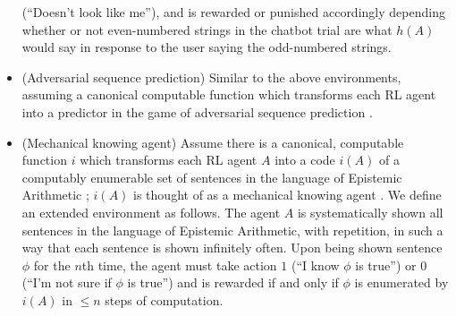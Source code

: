 \documentclass[runningheads]{llncs}
\begin{document}
\begin{example}
\begin{itemize}
        (``Doesn't look like me''), and is rewarded or punished accordingly depending
        whether or not even-numbered strings in the chatbot trial are what $h(A)$ would
        say in response to the user saying the odd-numbered strings.
        \item
        (Adversarial sequence prediction) Similar to the above environments, assuming
        a canonical computable function which transforms each RL agent into a predictor
        in the game of adversarial sequence prediction \cite{hibbard2008adversarial}
        \cite{hibbard}.
        \item
        (Mechanical knowing agent) Assume there is a canonical, computable function
        $i$ which transforms each RL agent $A$ into a code $i(A)$ of a computably
        enumerable set of sentences in the language of Epistemic Arithmetic
        \cite{shapiro}; $i(A)$ is thought of as a mechanical knowing agent
        \cite{carlson}. We define an extended environment as follows. The agent $A$
        is systematically shown all sentences in the language of Epistemic Arithmetic,
        with repetition, in such a way that each sentence is shown infinitely often.
        Upon being shown sentence $\phi$ for the $n$th time, the agent must take action
        $1$ (``I know $\phi$ is true'')
        or $0$ (``I'm not sure if $\phi$ is true'')
        and is rewarded if and only if $\phi$ is
        enumerated by $i(A)$ in $\leq n$ steps of computation.
    \end{itemize}
\end{example}





\end{document}

